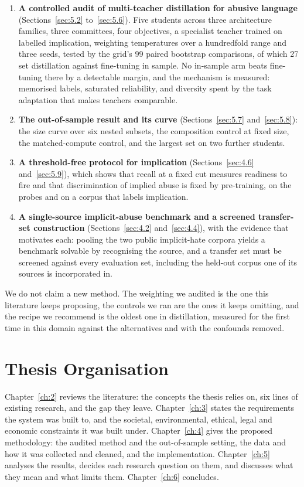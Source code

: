 \begin{enumerate}
  \item \textbf{A controlled audit of multi-teacher distillation for abusive language}
    (Sections~\ref{sec:5.2} to~\ref{sec:5.6}). Five students across three architecture families,
    three committees, four objectives, a specialist teacher trained on labelled implication,
    weighting temperatures over a hundredfold range and three seeds, tested by the grid's 99 paired
    bootstrap comparisons, of which 27 set distillation against fine-tuning in sample. No in-sample
    arm beats fine-tuning there by a detectable margin, and the mechanism is measured: memorised
    labels, saturated reliability, and diversity spent by the task adaptation that makes teachers
    comparable.
  \item \textbf{The out-of-sample result and its curve} (Sections~\ref{sec:5.7} and~\ref{sec:5.8}):
    the size curve over six nested subsets, the composition control at fixed size, the
    matched-compute control, and the largest set on two further students.
  \item \textbf{A threshold-free protocol for implication} (Sections~\ref{sec:4.6}
    and~\ref{sec:5.9}), which shows that recall at a fixed cut measures readiness to fire and that
    discrimination of implied abuse is fixed by pre-training, on the probes and on a corpus that
    labels implication.
  \item \textbf{A single-source implicit-abuse benchmark and a screened transfer-set construction}
    (Sections~\ref{sec:4.2} and~\ref{sec:4.4}), with the evidence that motivates each: pooling the
    two public implicit-hate corpora yields a benchmark solvable by recognising the source, and a
    transfer set must be screened against every evaluation set, including the held-out corpus one of
    its sources is incorporated in.
\end{enumerate}

We do not claim a new method. The weighting we audited is the one this literature keeps proposing,
the controls we ran are the ones it keeps omitting, and the recipe we recommend is the oldest one in
distillation, measured for the first time in this domain against the alternatives and with the
confounds removed.

\section{Thesis Organisation}
\label{sec:1.7}
Chapter~\ref{ch:2} reviews the literature: the concepts the thesis relies on, six lines of existing
research, and the gap they leave. Chapter~\ref{ch:3} states the requirements the system was built to,
and the societal, environmental, ethical, legal and economic constraints it was built under.
Chapter~\ref{ch:4} gives the proposed methodology: the audited method and the out-of-sample setting,
the data and how it was collected and cleaned, and the implementation. Chapter~\ref{ch:5} analyses the
results, decides each research question on them, and discusses what they mean and what limits them.
Chapter~\ref{ch:6} concludes.
